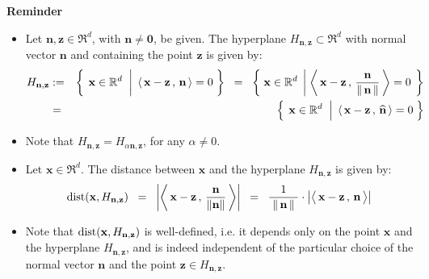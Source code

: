 \vskip 0.8cm
\noindent
\textbf{Reminder}
\begin{itemize}
\item  Let $\mathbf{n}, \mathbf{z} \in \Re^{d}$, with $\mathbf{n} \neq \mathbf{0}$, be given.
          The hyperplane $H_{\mathbf{n},\mathbf{z}} \subset \Re^{d}$ with normal vector $\mathbf{n}$ and
          containing the point $\mathbf{z}$ is given by: 
          \begin{eqnarray*}
          H_{\mathbf{n},\mathbf{z}}
          & := &
          \left\{\;
          	\left.
          	\mathbf{x}\overset{{\color{white}1}}{\in}\Re^{d}
		\;\;\right\vert\;
			\left\langle\,\mathbf{x}-\mathbf{z}\,,\,\mathbf{n}\,\right\rangle = 0
			\;\right\}
	\;\; = \;\;
	\left\{\;
		\mathbf{x}\in\Re^{d}
		\;\left\vert\;
			\left\langle\,\mathbf{x}-\mathbf{z}\,,\,\frac{\mathbf{n}}{\Vert\,\mathbf{n}\,\Vert}\,\right\rangle = 0
			\right.\;\right\}
	\\
	& = &
	\left\{\;
		\left.
		\mathbf{x}\overset{{\color{white}.}}{\in}\Re^{d}
		\;\;\right\vert\;
			\left\langle\,\mathbf{x}-\mathbf{z}\,,\,\widehat{\mathbf{n}}\,\right\rangle = 0
		\;\right\}
	\end{eqnarray*}
	
\item
	Note that $H_{\mathbf{n},\mathbf{z}} = H_{\alpha\mathbf{n},\mathbf{z}}$, for any $\alpha \neq 0$.
\item
	Let $\mathbf{x} \in \Re^{d}$.  The distance between $\mathbf{x}$ and the hyperplane $H_{\mathbf{n},\mathbf{z}}$
	is given by:
	\begin{equation*}
	\dist\!\left(\mathbf{x},H_{\mathbf{n},\mathbf{z}}\right)
	\;\; = \;\;
		\left\vert
		\left\langle\,\mathbf{x}-\mathbf{z}\,,\,\dfrac{\mathbf{n}}{\Vert\mathbf{n}\Vert}\,\right\rangle
		\right\vert
	\;\; = \;\;
		\dfrac{1}{{\color{white}.}\Vert\,\mathbf{n}\,\Vert{\color{white}.}}
		\cdot
		\left\vert
		\left\langle\,\mathbf{x}-\mathbf{z}\,,\,\overset{{\color{white}.}}{\mathbf{n}}\,\right\rangle
		\right\vert
	\end{equation*}
\item
	Note that
	$\textnormal{dist}\!\left(\mathbf{x},H_{\mathbf{n},\mathbf{z}}\right)$ is well-defined,
	i.e. it depends only on the point $\mathbf{x}$ and the hyperplane
	$H_{\mathbf{n},\mathbf{z}}$, and is indeed independent of the particular choice
	of the normal vector $\mathbf{n}$ and the point
	$\mathbf{z} \in H_{\mathbf{n},\mathbf{z}}$. 
\end{itemize}

